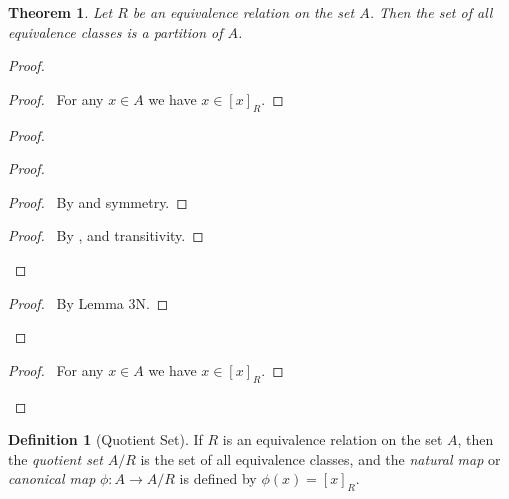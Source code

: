 \documentclass{article}
\let\qed\relax
\newtheorem{theorem}[axiom]{Theorem}
\theoremstyle{definition}
\newtheorem{definition}[axiom]{Definition}
\begin{document}
    \begin{theorem}
        Let $R$ be an equivalence relation on the set $A$. Then the set of all equivalence classes is a
        partition of $A$.
    \end{theorem}

    \begin{proof}
        \pf
        \begin{proof}
            \pf\ For any $x \in A$ we have $x \in [x]_R$.
        \end{proof}
        \begin{proof}
            \begin{proof}
                \begin{proof}
                    \pf\ By  and symmetry.
                \end{proof}
                \begin{proof}
                    \pf\ By ,  and transitivity.
                \end{proof}
            \end{proof}
            \begin{proof}
                \pf\ By Lemma 3N.
            \end{proof}
        \end{proof}
        \begin{proof}
            \pf\ For any $x \in A$ we have $x \in [x]_R$.
        \end{proof}
        \qed
    \end{proof}

    \begin{definition}[Quotient Set]
        If $R$ is an equivalence relation on the set $A$, then the \emph{quotient set} $A / R$
        is the set of all equivalence classes, and the \emph{natural map} or \emph{canonical map}
        $\phi : A \rightarrow A/R$ is defined by $\phi(x) = [x]_R$.
    \end{definition}
\end{document}
